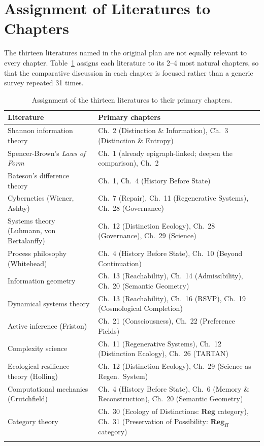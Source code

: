 \documentclass[11pt]{report}
\begin{document}
\section{Assignment of Literatures to Chapters}

The thirteen literatures named in the original plan are not
equally relevant to every chapter. Table~\ref{tab:priority-c}
assigns each literature to its 2--4 most natural chapters, so
that the comparative discussion in each chapter is focused
rather than a generic survey repeated 31 times.

\begin{longtable}{@{}p{4cm}p{10.9cm}@{}}
\toprule
Literature & Primary chapters \\
\midrule
\endhead
Shannon information theory & Ch.~2 (Distinction \& Information), Ch.~3 (Distinction \& Entropy) \\
Spencer-Brown's \textit{Laws of Form} & Ch.~1 (already epigraph-linked; deepen the comparison), Ch.~2 \\
Bateson's difference theory & Ch.~1, Ch.~4 (History Before State) \\
Cybernetics (Wiener, Ashby) & Ch.~7 (Repair), Ch.~11 (Regenerative Systems), Ch.~28 (Governance) \\
Systems theory (Luhmann, von Bertalanffy) & Ch.~12 (Distinction Ecology), Ch.~28 (Governance), Ch.~29 (Science) \\
Process philosophy (Whitehead) & Ch.~4 (History Before State), Ch.~10 (Beyond Continuation) \\
Information geometry & Ch.~13 (Reachability), Ch.~14 (Admissibility), Ch.~20 (Semantic Geometry) \\
Dynamical systems theory & Ch.~13 (Reachability), Ch.~16 (RSVP), Ch.~19 (Cosmological Completion) \\
Active inference (Friston) & Ch.~21 (Consciousness), Ch.~22 (Preference Fields) \\
Complexity science & Ch.~11 (Regenerative Systems), Ch.~12 (Distinction Ecology), Ch.~26 (TARTAN) \\
Ecological resilience theory (Holling) & Ch.~12 (Distinction Ecology), Ch.~29 (Science as Regen.\ System) \\
Computational mechanics (Crutchfield) & Ch.~4 (History Before State), Ch.~6 (Memory \& Reconstruction), Ch.~20 (Semantic Geometry) \\
Category theory & Ch.~30 (Ecology of Distinctions: $\mathbf{Reg}$ category), Ch.~31 (Preservation of Possibility: $\mathbf{Reg}_\Pi$ category) \\
\bottomrule
\caption{Assignment of the thirteen literatures to their
  primary chapters.}
\label{tab:priority-c}
\end{longtable}
\end{document}

